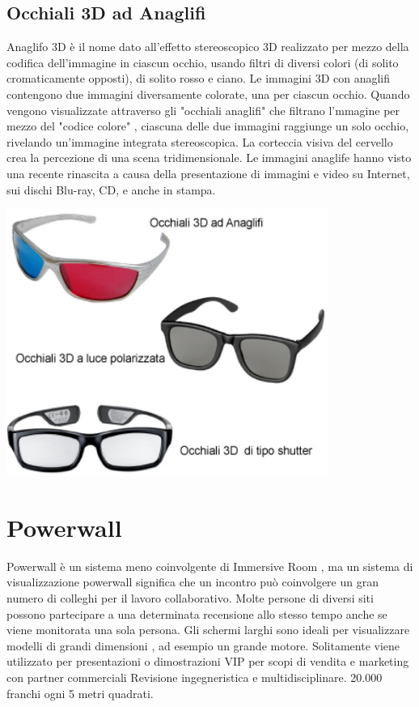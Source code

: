 \documentclass[8pt]{extarticle}
\begin{document}
\begin{multicols}{3}
\subsection{Occhiali 3D ad Anaglifi}
Anaglifo 3D è il nome dato all'effetto stereoscopico 3D realizzato per mezzo della codifica dell'immagine in ciascun occhio, usando filtri di diversi colori (di solito cromaticamente opposti), di solito rosso e ciano. Le immagini 3D con anaglifi contengono due immagini diversamente colorate, una per ciascun occhio. Quando vengono visualizzate attraverso gli "occhiali anaglifi" che filtrano l'mmagine per mezzo del "codice colore" , ciascuna delle due immagini raggiunge un solo occhio, rivelando un'immagine integrata stereoscopica. La corteccia visiva del cervello crea la percezione di una scena tridimensionale. Le immagini anaglife hanno visto una recente rinascita a causa della presentazione di immagini e video su Internet, sui dischi Blu-ray, CD, e anche in stampa.

\begin{center}
    \begin{minipage}{\columnwidth}
        \includegraphics[width=\columnwidth]{glasses.png}
    \end{minipage}
\end{center}

\section{Powerwall}
Powerwall è un sistema meno coinvolgente di Immersive Room , ma un sistema di visualizzazione powerwall significa che un incontro può coinvolgere un gran numero di colleghi per il lavoro collaborativo. Molte persone di diversi siti possono partecipare a una determinata recensione allo stesso tempo anche se viene monitorata una sola persona. Gli schermi larghi sono ideali per visualizzare modelli di grandi dimensioni , ad esempio un grande motore.
Solitamente viene utilizzato per presentazioni o dimostrazioni VIP per scopi di vendita e marketing con partner commerciali
Revisione ingegneristica e multidisciplinare. 20.000 franchi ogni 5 metri quadrati.

\end{multicols}
\end{document}
